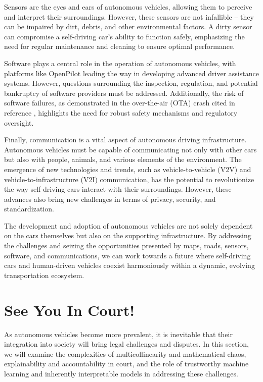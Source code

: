 Sensors are the eyes and ears of autonomous vehicles, allowing them to perceive and interpret their surroundings. However, these sensors are not infallible – they can be impaired by dirt, debris, and other environmental factors. A dirty sensor can compromise a self-driving car's ability to function safely, emphasizing the need for regular maintenance and cleaning to ensure optimal performance.

Software plays a central role in the operation of autonomous vehicles, with platforms like OpenPilot \cite{openpilot} leading the way in developing advanced driver assistance systems. However, questions surrounding the inspection, regulation, and potential bankruptcy of software providers must be addressed. Additionally, the risk of software failures, as demonstrated in the over-the-air (OTA) crash cited in reference \cite{otacrash}, highlights the need for robust safety mechanisms and regulatory oversight.

Finally, communication is a vital aspect of autonomous driving infrastructure. Autonomous vehicles must be capable of communicating not only with other cars but also with people, animals, and various elements of the environment. The emergence of new technologies and trends, such as vehicle-to-vehicle (V2V) and vehicle-to-infrastructure (V2I) communication, has the potential to revolutionize the way self-driving cars interact with their surroundings. However, these advances also bring new challenges in terms of privacy, security, and standardization.

The development and adoption of autonomous vehicles are not solely dependent on the cars themselves but also on the supporting infrastructure. By addressing the challenges and seizing the opportunities presented by maps, roads, sensors, software, and communications, we can work towards a future where self-driving cars and human-driven vehicles coexist harmoniously within a dynamic, evolving transportation ecosystem.

\section{See You In Court!}

As autonomous vehicles become more prevalent, it is inevitable that their integration into society will bring legal challenges and disputes. In this section, we will examine the complexities of multicollinearity and mathematical chaos, explainability and accountability in court, and the role of trustworthy machine learning and inherently interpretable models in addressing these challenges.

